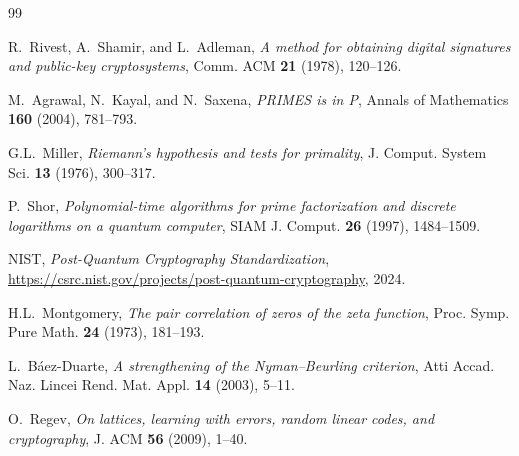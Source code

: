 \documentclass[11pt,a4paper]{article}
\theoremstyle{definition}
\theoremstyle{plain}
\begin{document}
\vspace{1cm}

\begin{thebibliography}{99}

R.~Rivest, A.~Shamir, and L.~Adleman, \emph{A method for obtaining
digital signatures and public-key cryptosystems}, Comm. ACM
\textbf{21} (1978), 120--126.

M.~Agrawal, N.~Kayal, and N.~Saxena, \emph{PRIMES is in P},
Annals of Mathematics \textbf{160} (2004), 781--793.

G.L.~Miller, \emph{Riemann's hypothesis and tests for primality},
J. Comput. System Sci. \textbf{13} (1976), 300--317.

P.~Shor, \emph{Polynomial-time algorithms for prime factorization
and discrete logarithms on a quantum computer}, SIAM J. Comput.
\textbf{26} (1997), 1484--1509.

NIST, \emph{Post-Quantum Cryptography Standardization},
\url{https://csrc.nist.gov/projects/post-quantum-cryptography}, 2024.

H.L.~Montgomery, \emph{The pair correlation of zeros of the zeta
function}, Proc. Symp. Pure Math. \textbf{24} (1973), 181--193.

L.~B\'aez-Duarte, \emph{A strengthening of the Nyman--Beurling
criterion}, Atti Accad. Naz. Lincei Rend. Mat. Appl. \textbf{14}
(2003), 5--11.

O.~Regev, \emph{On lattices, learning with errors, random linear
codes, and cryptography}, J. ACM \textbf{56} (2009), 1--40.

\end{thebibliography}
\end{document}
